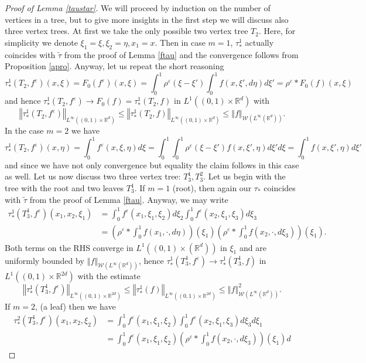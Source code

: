 \documentclass[10pt,a4paper]{amsart}
\newcommand{\R}{\mathbb{R}}
\newcommand{\W}{\mathcal{W}}
\newcommand{\izj}{\int_{0}^{1}}
\newcommand*{\norm}[1]{\left\Vert{#1}\right\Vert}
\newcommand{\ve}{\varepsilon}
\begin{document}
\begin{proof}[Proof of Lemma \ref{taustar}]
We will proceed by induction on the number of vertices in a tree, but to give more insights in the first step we will discuss also three vertex trees. At first we take the only possible two vertex tree $T_2$. Here, for simplicity we denote $\xi_1 = \xi, \xi_2 = \eta, x_1 = x$. Then in case $m = 1$, $\tau^1_{*}$ actually coincides with $\tilde{\tau}$ from the proof of Lemma \ref{ftau} and the convergence follows from Proposition \ref{apro}. Anyway, let us repeat the short reasoning
\[
\tau_{*}^1(T_2,f^{\ve})(x,\xi) = F_{0}(f^{\ve})(x,\xi) = \izj  \rho^\ve(\xi-\xi')\izj f(x,\xi',d\eta) d\xi' = \rho^\ve * F_0(f)(x,\xi)
\]
and hence $\tau_{*}^1(T_2,f^{\ve}) \rightarrow F_0(f) = \tau^1_{*}(T_2,f)$ in $L^{1}((0,1)\times \R^d)$  with 
\[
 \norm{\tau^1_{*}(T_2,f^{\ve})}_{L^{\infty}((0,1)\times \R^d)} \leq \norm{\tau^1_{*}(T_2,f)}_{L^{\infty}((0,1)\times \R^d)} \leq \norm{f}_{\W(L^{\infty}(\R^d))}.
\]
In the case $m=2$ we have
\[
\tau_{*}^1(T_2,f^{\ve})(x,\eta) =\izj f^{\ve}(x,\xi,\eta)d\xi= \izj  \izj \rho^\ve(\xi-\xi') f(x,\xi',\eta) d\xi'd\xi = \izj f(x,\xi',\eta)d\xi'
\]
and since we have not only convergence but equality the claim follows in this case as well. 
Let us now discuss two three vertex tree: $T_3^1, T_3^2$. Let us begin with the tree with the root and two leaves  $T_3^1$. If $m=1$ (root), then again our $\tau_*$ coincides with $\tilde{\tau}$ from the proof of Lemma \ref{ftau}. Anyway, we may write
\begin{align*}
\tau_{*}^1(T_3^1,f^{\ve})(x_1,x_2,\xi_1) &= \izj f^\ve(x_1,\xi_1,\xi_2)d\xi_2 \izj f^{\ve}(x_2,\xi_1,\xi_3)d\xi_3
\\
&= \left(\rho^{\ve}* \izj f(x_1,\cdot,d\eta)\right)(\xi_1)\left(\rho^{\ve}* \izj f(x_2,\cdot,d\xi_3)\right)(\xi_1).
\end{align*}
Both terms on the RHS converge in $L^{1}((0,1)\times (\R^d))$ in $\xi_1$ and are uniformly bounded  by $\norm{f}_{\W(L^{\infty}(\R^d))}$, hence $\tau^1_{*}(T_3^1,f^{\ve}) \rightarrow \tau^1_{*}(T_3^1,f)$ in $L^{1}((0,1)\times \R^{2d})$ with the estimate
\[
 \norm{\tau^1_{*}(T^1_3,f^{\ve})}_{L^{\infty}((0,1)\times \R^{2d})} \leq \norm{\tau^1_{*}(f)}_{L^{\infty}((0,1)\times \R^{2d})} \leq \norm{f}^2_{\W(L^{\infty}(\R^d))}.
\]
If $m=2$, (a leaf) then we have
\begin{align*}
\tau_{*}^2(T_3^1,f^{\ve})(x_1,x_2,\xi_2) &= \izj f^\ve(x_1,\xi_1,\xi_2) \izj f^{\ve}(x_2,\xi_1,\xi_3)d\xi_3 d\xi_1\\
&= \izj f^\ve(x_1,\xi_1,\xi_2)\left(\rho^{\ve}* \izj f(x_2,\cdot,d\xi_3)\right)(\xi_1)d

\end{align*}
\end{proof}
\end{document}
